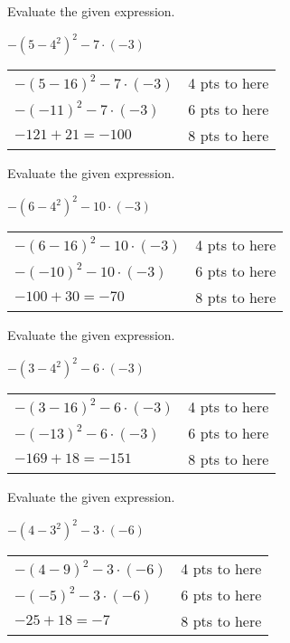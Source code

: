 {
	Evaluate the given expression.
	
	$-(5-4^2)^2-7\cdot(-3)$
}
{
	\begin{tabular}{l r}
	$-(5-16)^2-7\cdot(-3)$ & 4 pts to here\\
	$-(-11)^2-7\cdot(-3)$ & 6 pts to here\\
	$-121+21=-100$ & 8 pts to here\\
	\end{tabular}
}

{
	Evaluate the given expression.
	
	$-(6-4^2)^2-10\cdot(-3)$
}
{
	\begin{tabular}{l r}
	$-(6-16)^2-10\cdot(-3)$ & 4 pts to here\\
	$-(-10)^2-10\cdot(-3)$ & 6 pts to here\\
	$-100+30=-70$ & 8 pts to here\\
	\end{tabular}
}

{
	Evaluate the given expression.
	
	$-(3-4^2)^2-6\cdot(-3)$
}
{
	\begin{tabular}{l r}
	$-(3-16)^2-6\cdot(-3)$ & 4 pts to here\\
	$-(-13)^2-6\cdot(-3)$ & 6 pts to here\\
	$-169+18=-151$ & 8 pts to here\\
	\end{tabular}
}

{
	Evaluate the given expression.
	
	$-(4-3^2)^2-3\cdot(-6)$
}
{
	\begin{tabular}{l r}
	$-(4-9)^2-3\cdot(-6)$ & 4 pts to here\\
	$-(-5)^2-3\cdot(-6)$ & 6 pts to here\\
	$-25+18=-7$ & 8 pts to here\\
	\end{tabular}
}
